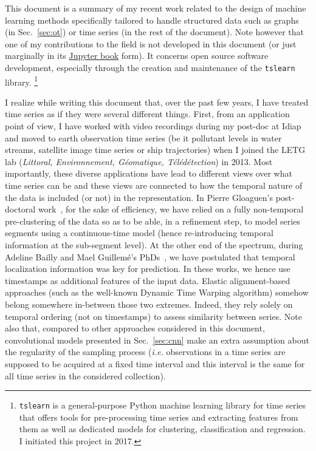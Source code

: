 This document is a summary of my recent work related to the design of
machine learning methods specifically tailored to handle structured data such
as graphs (in Sec.~\ref{sec:ot}) or time series (in the rest of the
document).
Note however that one of my contributions to the field is not developed in
this document (or just marginally in its
\href{https://rtavenar.github.io/hdr/}{Jupyter book} form). It concerns open
source software development, especially through the creation and
maintenance of the \texttt{tslearn}~\cite{tslearn} library.%
\footnote{\texttt{tslearn} is a general-purpose Python machine learning library
    for time series that offers tools for pre-processing time series and
    extracting features from them
    as well as dedicated models for clustering, classification and regression.
    I initiated this project in 2017.}

I realize while writing this document that, over the past few years, I
have treated time series as if they were several different things.
First, from an application point of view, I have worked with video recordings
during my post-doc at Idiap and moved to earth observation time series
(be it pollutant levels in water streams, satellite image time series or ship
trajectories) when I joined the LETG lab (\emph{Littoral, Environnement,
Géomatique, Télédétection}) in 2013.
Most importantly, these diverse applications have lead to different views
over what time series can be and these views are connected to how the temporal
nature of the data is included (or not) in the representation.
In Pierre Gloaguen's post-doctoral work~\cite{gloaguen2020}, for the sake of
efficiency, we have relied on a fully
non-temporal pre-clustering of the data so as to be able, in a refinement step,
to model series segments using a continuous-time model (hence re-introducing
temporal information at the sub-segment level).
At the other end of the spectrum,
during Adeline Bailly and Mael Guillemé's
PhDs~\cite{guilleme:hal-02513295,tavenard:halshs-01561461},
we have postulated that temporal localization information was key for
prediction.
In these works, we hence use timestamps as additional features of the
input data.
Elastic alignment-based approaches (such as the well-known Dynamic Time Warping
algorithm)
somehow belong somewhere in-between those two extremes.
Indeed, they rely solely on temporal ordering
(not on timestamps) to assess similarity between series.
Note also that, compared to other approaches considered in this document,
convolutional models presented in Sec.~\ref{sec:cnn} make an
extra assumption about the regularity of the sampling process (\emph{i.e.}
observations in a time series are supposed to be acquired at a fixed time
interval and this interval is the same for all time series in the considered
collection).

